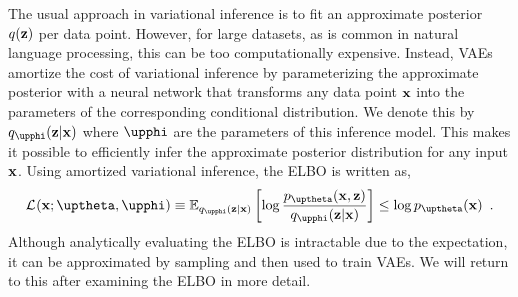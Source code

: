 The usual approach in variational inference is to fit an approximate posterior $q({\mathbf{z}})$ per data point. However, for large datasets, as is common in natural language processing, this can be too computationally expensive. 
Instead, VAEs amortize the cost of variational inference by parameterizing the approximate posterior with a neural network that transforms any data point ${\mathbf{x}}$ into the parameters of the corresponding conditional distribution. We denote this by $q_\phib(\zb|\xb)$ where $\phib$ are the parameters of this inference model. This makes it possible to efficiently infer the approximate posterior distribution for any input ${\mathbf{x}}$. 
Using amortized variational inference, the ELBO is written as,
%
\begin{equation} \label{eq:variational-autoencoder-elbo}
    \mathcal{L}_{}(\xb;\thetab,\phib) \equiv \mathbb{E}_{q_\phib(\zb|\xb)} \left[ \log \frac{p_\thetab(\xb,\zb)}{q_\phib(\zb|\xb)} \right] \leq \log p_\thetab(\xb) \enspace .
\end{equation}
%
Although analytically evaluating the ELBO is intractable due to the expectation, it can be approximated by sampling and then used to train VAEs. We will return to this after examining the ELBO in more detail.



